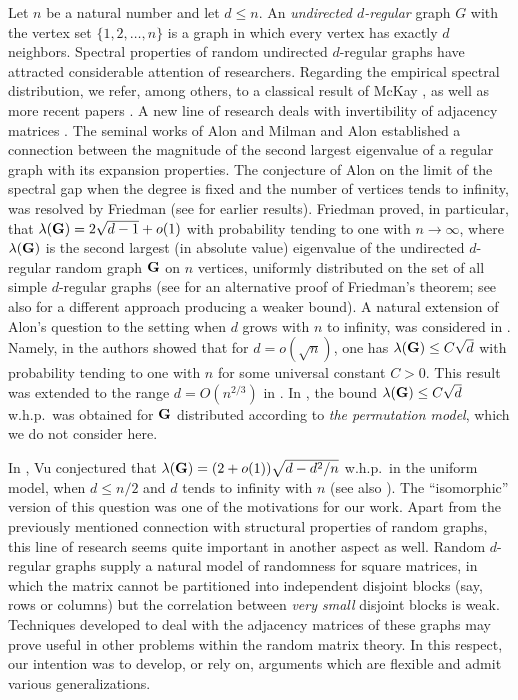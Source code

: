 \documentclass[12pt]{article}
\theoremstyle{definition}
\theoremstyle{plain}
\def\nrangr{G}
\def\rangr{{\bf{}G}}
\begin{document}
Let $n$ be a natural number and let $d\leq n$. An {\it undirected $d$-regular} graph
$\nrangr$ with the vertex set $\{1,2,\ldots,n\}$ is a graph in which every vertex has exactly $d$ neighbors.
Spectral properties of random undirected $d$-regular graphs
have attracted considerable attention of researchers.
Regarding the empirical spectral distribution,
we refer, among others, to a classical result of McKay \cite{McKay}, as well as more recent papers \cite{DP,TVW,BKY}.
A new line of research deals with invertibility of adjacency matrices \cite{Cook PTRF,LLTTY}.
The seminal works of Alon and Milman \cite{AM} and Alon \cite{Alon}
established a connection between the magnitude of the second largest eigenvalue
of a regular graph with its expansion properties. The conjecture of Alon \cite{Alon} on the limit of
the spectral gap when the degree is fixed and the number of vertices tends to infinity, was resolved by Friedman \cite{Friedman}
(see \cite{BS,FKS,F91} for earlier results).
Friedman proved, in particular, that
$\lambda(\rangr)=2\sqrt{d-1}+o(1)$ with probability tending to one with $n\to\infty$, where
$\lambda(\rangr)$ is the second largest (in absolute value) eigenvalue of the undirected $d$-regular random graph
$\rangr$ on $n$ vertices, uniformly distributed on the set of all simple $d$-regular graphs
(see \cite{B} for an alternative proof of Friedman's theorem; see also \cite{puder} for a different approach producing a weaker bound).
A natural extension of Alon's question to the setting when $d$ grows with $n$ to infinity,
was considered in \cite{BFSU,DJPP,CGJ}. Namely, in \cite{BFSU} the authors showed that for
$d=o(\sqrt{n})$, one has $\lambda(\rangr)\leq C\sqrt{d}$ with probability tending to one with $n$
for some universal constant $C>0$. This result was extended to the range $d=O(n^{2/3})$ in \cite{CGJ}.
In \cite{DJPP}, the bound $\lambda(\rangr)\leq C\sqrt{d}$ w.h.p.\ was obtained for $\rangr$
distributed according to {\it the permutation model}, which we do not consider here.


In \cite{Vu}, Vu conjectured that $\lambda(\rangr)=(2+o(1))\sqrt{d-d^2/n}$ w.h.p.\ in the uniform model, when
$d\leq n/2$ and $d$ tends to infinity with $n$
(see also \cite[Conjectures~7.3, 7.4]{Vu ICM}). The ``isomorphic'' version of this question
was one of the motivations for our work. Apart from the previously mentioned connection with structural properties
of random graphs, this line of research
seems quite important in another aspect as well.
Random $d$-regular graphs supply a natural model of randomness for square matrices,
in which the matrix cannot be partitioned into independent disjoint blocks (say, rows or columns)
but the correlation between {\it very small} disjoint blocks is weak.
Techniques developed to deal with the adjacency matrices of these graphs may prove useful in other
problems within the random matrix theory.
In this respect, our intention was to develop, or rely on,
arguments which are flexible and admit various generalizations.
\end{document}
